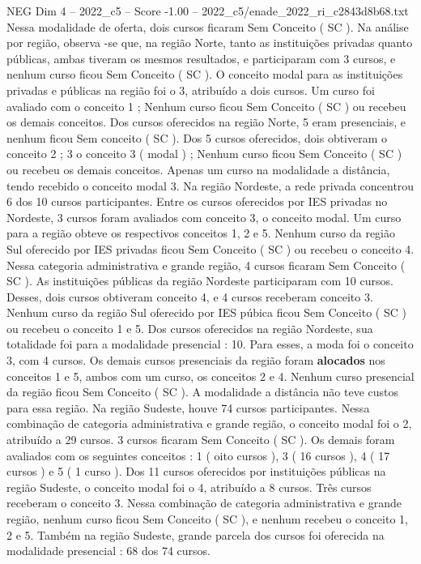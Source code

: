 \begin{textsample}{NEG Dim 4 – 2022\_c5 – Score -1.00 – 2022\_c5/enade\_2022\_ri\_c2843d8b68.txt}
Nessa modalidade de oferta, dois cursos ficaram Sem Conceito ( SC ).
Na análise por região, observa -se que, na região Norte, tanto as instituições privadas quanto públicas, ambas tiveram os mesmos resultados, e participaram com 3 cursos, e nenhum curso ficou Sem Conceito ( SC ).
O conceito modal para as instituições privadas e públicas na região foi o 3, atribuído a dois cursos.
Um curso foi avaliado com o conceito 1 ; Nenhum curso ficou Sem Conceito ( SC ) ou recebeu os demais conceitos.
Dos cursos oferecidos na região Norte, 5 eram presenciais, e nenhum ficou Sem conceito ( SC ).
Dos 5 cursos oferecidos, dois obtiveram o conceito 2 ; 3 o conceito 3 ( modal ) ; Nenhum curso ficou Sem Conceito ( SC ) ou recebeu os demais conceitos.
Apenas um curso na modalidade a distância, tendo recebido o conceito modal 3.
Na região Nordeste, a rede privada concentrou 6 dos 10 cursos participantes.
Entre os cursos oferecidos por IES privadas no Nordeste, 3 cursos foram avaliados com conceito 3, o conceito modal.
Um curso para a região obteve os respectivos conceitos 1, 2 e 5.
Nenhum curso da região Sul oferecido por IES privadas ficou Sem Conceito ( SC ) ou recebeu o conceito 4.
Nessa categoria administrativa e grande região, 4 cursos ficaram Sem Conceito ( SC ).
As instituições públicas da região Nordeste participaram com 10 cursos.
Desses, dois cursos obtiveram conceito 4, e 4 cursos receberam conceito 3.
Nenhum curso da região Sul oferecido por IES púbica ficou Sem Conceito ( SC ) ou recebeu o conceito 1 e 5.
Dos cursos oferecidos na região Nordeste, sua totalidade foi para a modalidade presencial : 10.
Para esses, a moda foi o conceito 3, com 4 cursos.
Os demais cursos presenciais da região foram \textbf{alocados} nos conceitos 1 e 5, ambos com um curso, os conceitos 2 e 4.
Nenhum curso presencial da região ficou Sem Conceito ( SC ).
A modalidade a distância não teve custos para essa região.
Na região Sudeste, houve 74 cursos participantes.
Nessa combinação de categoria administrativa e grande região, o conceito modal foi o 2, atribuído a 29 cursos. 3 cursos ficaram Sem Conceito ( SC ).
Os demais foram avaliados com os seguintes conceitos : 1 ( oito cursos ), 3 ( 16 cursos ), 4 ( 17 cursos ) e 5 ( 1 curso ).
Dos 11 cursos oferecidos por instituições públicas na região Sudeste, o conceito modal foi o 4, atribuído a 8 cursos.
Três cursos receberam o conceito 3.
Nessa combinação de categoria administrativa e grande região, nenhum curso ficou Sem Conceito ( SC ), e nenhum recebeu o conceito 1, 2 e 5.
Também na região Sudeste, grande parcela dos cursos foi oferecida na modalidade presencial : 68 dos 74 cursos.

\end{textsample}
